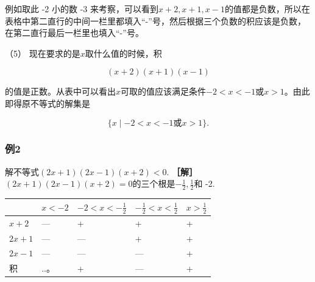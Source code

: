 例如取此 -2 小的数 -3
来考察，可以看到\(x + 2, x + 1, x - 1\)的值都是负数，所以在表格中第二直行的中间一栏里都填入``-''号，然后根据三个负数的积应该是负数，在第二直行最后一栏里也填入``-''号。

（5） 现在要求的是\(x\)取什么值的时候，积

\[
(x + 2) (x + 1) (x - 1)
\]

的值是正数。从表中可以看出\(x\)可取的值应该满足条件\(-2 < x < -1\)或\(x > 1\)。由此即得原不等式的解集是

\[
\{x \mid - 2 < x < - 1 \text{或} x > 1 \}.
\]

\subsubsection{例2}

解不等式\((2x+1)(2x-1)(x+2)<0.\) \textbf{［解］}
\((2x + 1)(2x - 1)(x + 2) = 0\)的三个根是\(-\frac{1}{2}, \frac{1}{2}\)和
-2.

{\def\LTcaptype{none} %
\begin{longtable}[]{@{}
  >{\raggedright\arraybackslash}p{}
  >{\raggedright\arraybackslash}p{}
  >{\raggedright\arraybackslash}p{}
  >{\raggedright\arraybackslash}p{}
  >{\raggedright\arraybackslash}p{}@{}}
\toprule\noalign{}
\begin{minipage}[b]{\linewidth}\raggedright
\end{minipage} & \begin{minipage}[b]{\linewidth}\raggedright
\(x < -2\)
\end{minipage} & \begin{minipage}[b]{\linewidth}\raggedright
\(-2 < x < -\frac{1}{2}\)
\end{minipage} & \begin{minipage}[b]{\linewidth}\raggedright
\(-\frac{1}{2} < x < \frac{1}{2}\)
\end{minipage} & \begin{minipage}[b]{\linewidth}\raggedright
\(x > \frac{1}{2}\)
\end{minipage} \\
\midrule\noalign{}
\endhead
\bottomrule\noalign{}
\endlastfoot
\(x + 2\) & --- & + & + & + \\
\(2x + 1\) & --- & --- & + & + \\
\(2x - 1\) & --- & --- & --- & + \\
积 & ..。 & + & --- & + \\
\end{longtable}
}

